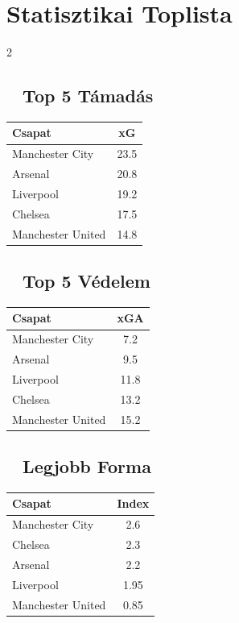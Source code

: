 \documentclass[11pt,a4paper]{article}
\begin{document}
\vspace{1em}

\begin{tcolorbox}[colback=yellow!10,colframe=yellow!50,title=\faStar~ Meglepetés Eredmények]
\end{tcolorbox}

\newpage

\section*{Statisztikai Toplista}

\begin{multicols}{2}

\subsection*{\faChartLine~ Top 5 Támadás}
\begin{tabular}{lc}
\toprule
\textbf{Csapat} & \textbf{xG} \\
\midrule
    Manchester City & 23.5 \\
    Arsenal & 20.8 \\
    Liverpool & 19.2 \\
    Chelsea & 17.5 \\
    Manchester United & 14.8 \\
\bottomrule
\end{tabular}

\vspace{1.5em}

\subsection*{\faChartLine~ Top 5 Védelem}
\begin{tabular}{lc}
\toprule
\textbf{Csapat} & \textbf{xGA} \\
\midrule
    Manchester City & 7.2 \\
    Arsenal & 9.5 \\
    Liverpool & 11.8 \\
    Chelsea & 13.2 \\
    Manchester United & 15.2 \\
\bottomrule
\end{tabular}

\columnbreak

\subsection*{\faFire~ Legjobb Forma}
\begin{tabular}{lc}
\toprule
\textbf{Csapat} & \textbf{Index} \\
\midrule
    Manchester City & 2.6 \\
    Chelsea & 2.3 \\
    Arsenal & 2.2 \\
    Liverpool & 1.95 \\
    Manchester United & 0.85 \\
\bottomrule
\end{tabular}


\end{multicols}
\end{document}
